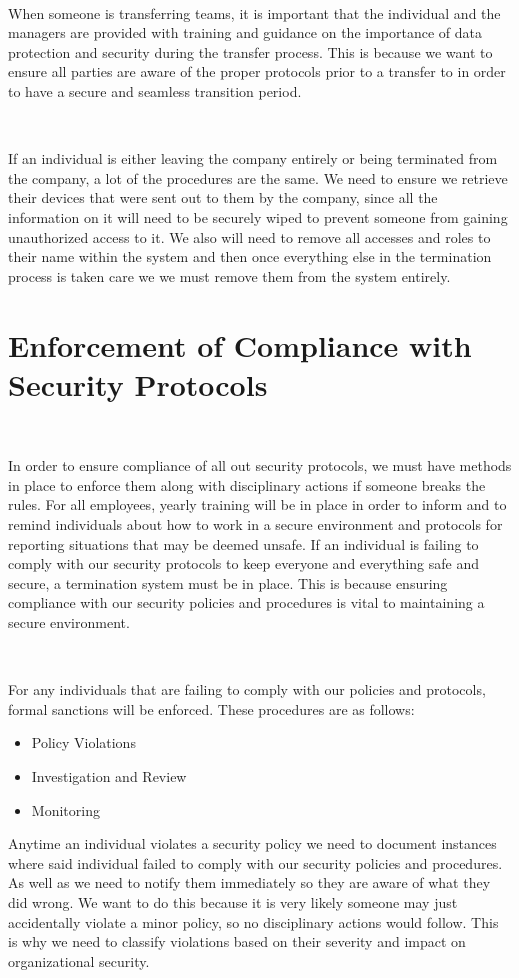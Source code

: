\documentclass[12pt,a4paper]{report}
\begin{document}
\

When someone is transferring teams, it is important that the individual and the managers are provided with training and guidance on the importance of data protection and security during the transfer process.
This is because we want to ensure all parties are aware of the proper protocols prior to a transfer to in order to have a secure and seamless transition period.

\

If an individual is either leaving the company entirely or being terminated from the company, a lot of the procedures are the same.
We need to ensure we retrieve their devices that were sent out to them by the company, since all the information on it will need to be securely wiped to prevent someone from gaining unauthorized access to it.
We also will need to remove all accesses and roles to their name within the system and then once everything else in the termination process is taken care we we must remove them from the system entirely.

\section{Enforcement of Compliance with Security Protocols}
\

In order to ensure compliance of all out security protocols, we must have methods in place to enforce them along with disciplinary actions if someone breaks the rules.
For all employees, yearly training will be in place in order to inform and to remind individuals about how to work in a secure environment and protocols for reporting situations that may be deemed unsafe.
If an individual is failing to comply with our security protocols to keep everyone and everything safe and secure, a termination system must be in place.
This is because ensuring compliance with our security policies and procedures is vital to maintaining a secure environment. 

\

For any individuals that are failing to comply with our policies and protocols, formal sanctions will be enforced.
These procedures are as follows:
\begin{itemize}
 \item Policy Violations
 \item Investigation and Review
 \item Monitoring
\end{itemize}

Anytime an individual violates a security policy we need to document instances where said individual failed to comply with our security policies and procedures.
As well as we need to notify them immediately so they are aware of what they did wrong.
We want to do this because it is very likely someone may just accidentally violate a minor policy, so no disciplinary actions would follow.
This is why we need to classify violations based on their severity and impact on organizational security.
\end{document}
